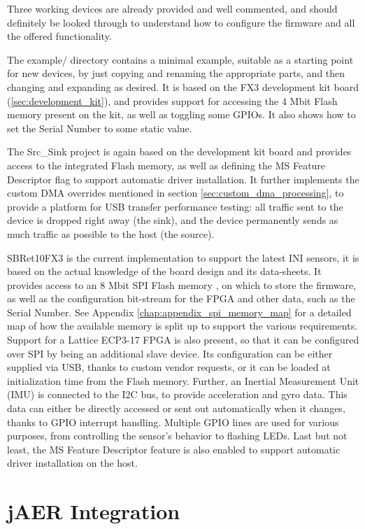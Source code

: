 \documentclass[a4paper,12pt]{report}
\begin{document}
Three working devices are already provided and well commented, and should definitely be looked through to understand how to configure the firmware and all the offered functionality.

The example/ directory contains a minimal example, suitable as a starting point for new devices, by just copying and renaming the appropriate parts, and then changing and expanding as desired. It is based on the FX3 development kit board (\ref{sec:development_kit}), and provides support for accessing the 4 Mbit Flash memory present on the kit, as well as toggling some GPIOs. It also shows how to set the Serial Number to some static value.

The Src\_Sink project is again based on the development kit board and provides access to the integrated Flash memory, as well as defining the MS Feature Descriptor flag to support automatic driver installation. It further implements the custom DMA overrides mentioned in section \ref{sec:custom_dma_processing}, to provide a platform for USB transfer performance testing: all traffic sent to the device is dropped right away (the sink), and the device permanently sends as much traffic as possible to the host (the source).

SBRet10FX3 is the current implementation to support the latest INI sensors, it is based on the actual knowledge of the board design and its data-sheets. It provides access to an 8 Mbit SPI Flash memory \cite{W25Q80BW}, on which to store the firmware, as well as the configuration bit-stream for the FPGA and other data, such as the Serial Number. See Appendix \ref{chap:appendix_spi_memory_map} for a detailed map of how the available memory is split up to support the various requirements. Support for a Lattice ECP3-17 FPGA \cite{DS1021} is also present, so that it can be configured over SPI \cite{TN1222} by being an additional slave device. Its configuration can be either supplied via USB, thanks to custom vendor requests, or it can be loaded at initialization time from the Flash memory. Further, an Inertial Measurement Unit (IMU) \cite{PS-MPU-6000A} is connected to the I2C bus, to provide acceleration and gyro data. This data can either be directly accessed or sent out automatically when it changes, thanks to GPIO interrupt handling. Multiple GPIO 
 lines are used for various purposes, from controlling the sensor's behavior to flashing LEDs. Last but not least, the MS Feature Descriptor feature is also enabled to support automatic driver installation on the host.

\chapter{jAER Integration} \label{chap:jaer_integration}
\end{document}
